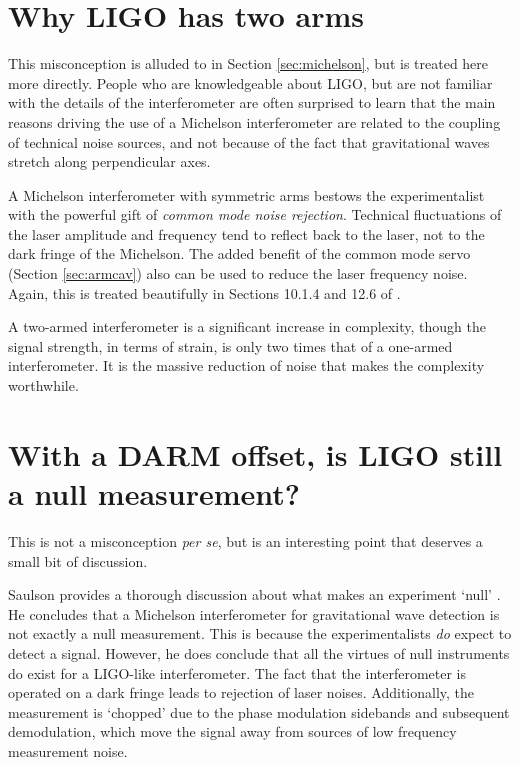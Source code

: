 \section{Why LIGO has two arms}
This misconception is alluded to in Section \ref{sec:michelson}, but is treated here more directly. %
People who are knowledgeable about LIGO, but are not familiar with the details of the interferometer are often surprised to learn that the main reasons driving the use of a Michelson interferometer are related to the coupling of technical noise sources, and not because of the fact that gravitational waves stretch along perpendicular axes.

A Michelson interferometer with symmetric arms bestows the experimentalist with the powerful gift of \emph{common mode noise rejection}. %
Technical fluctuations of the laser amplitude and frequency tend to reflect back to the laser, not to the dark fringe of the Michelson. %
The added benefit of the common mode servo (Section \ref{sec:armcav}) also can be used to reduce the laser frequency noise. %
Again, this is treated beautifully in Sections 10.1.4 and 12.6 of \citet{saulson1994fundamentals}. %


A two-armed interferometer is a significant increase in complexity, though the signal strength, in terms of strain, is only two times that of a one-armed interferometer. %
It is the massive reduction of noise that makes the complexity worthwhile.

\section{With a DARM offset, is LIGO still a null measurement?}
This is not a misconception {\it per se}, but is an interesting point that deserves a small bit of discussion.

Saulson provides a thorough discussion about what makes an experiment `null' \cite[Chapter 10]{saulson1994fundamentals}. %
He concludes that a Michelson interferometer for gravitational wave detection is not exactly a null measurement. %
This is because the experimentalists \emph{do} expect to detect a signal. %
However, he does conclude that all the virtues of null instruments do exist for a LIGO-like interferometer. %
The fact that the interferometer is operated on a dark fringe leads to rejection of laser noises. %
Additionally, the measurement is `chopped' due to the phase modulation sidebands and subsequent demodulation, which move the signal away from sources of low frequency measurement noise.

